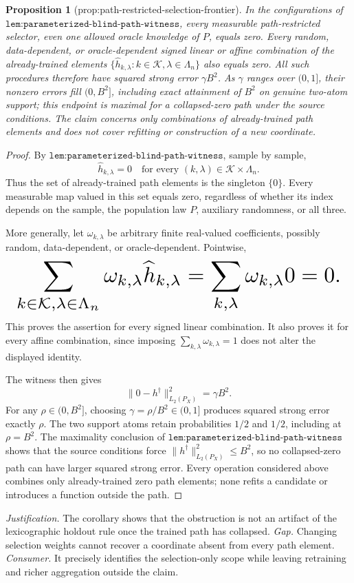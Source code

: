 \documentclass{article}
\newtheorem{proposition}{Proposition}
\begin{document}
\begin{proposition}[prop:path-restricted-selection-frontier]\label{prop:path-restricted-selection-frontier}
In the configurations of \(\texttt{lem:parameterized-blind-path-witness}\), every measurable path-restricted selector, even one allowed oracle knowledge of \(P\), equals zero. Every random, data-dependent, or oracle-dependent signed linear or affine combination of the already-trained elements \(\{\widehat h_{k,\lambda}:k\in\mathcal K,\lambda\in\Lambda_n\}\) also equals zero. All such procedures therefore have squared strong error \(\gamma B^2\). As \(\gamma\) ranges over \((0,1]\), their nonzero errors fill \((0,B^2]\), including exact attainment of \(B^2\) on genuine two-atom support; this endpoint is maximal for a collapsed-zero path under the source conditions. The claim concerns only combinations of already-trained path elements and does not cover refitting or construction of a new coordinate.
\end{proposition}
\begin{proof}
By \(\texttt{lem:parameterized-blind-path-witness}\), sample by sample,
\[
 \widehat h_{k,\lambda}=0
 \quad\text{for every }(k,\lambda)\in\mathcal K\times\Lambda_n.
\]
Thus the set of already-trained path elements is the singleton \(\{0\}\). Every measurable map valued in this set equals zero, regardless of whether its index depends on the sample, the population law \(P\), auxiliary randomness, or all three.

More generally, let \(\omega_{k,\lambda}\) be arbitrary finite real-valued coefficients, possibly random, data-dependent, or oracle-dependent. Pointwise,
\[
\makebox[\linewidth][c]{\resizebox{0.98\linewidth}{!}{\(\displaystyle \sum_{k\in\mathcal K,\lambda\in\Lambda_n}
 \omega_{k,\lambda}\widehat h_{k,\lambda}
 =\sum_{k,\lambda}\omega_{k,\lambda}0
 =0.\)}}
\]
This proves the assertion for every signed linear combination. It also proves it for every affine combination, since imposing \(\sum_{k,\lambda}\omega_{k,\lambda}=1\) does not alter the displayed identity.

The witness then gives
\[
 \|0-h^\dagger\|_{L_2(P_X)}^2=\gamma B^2.
\]
For any \(\rho\in(0,B^2]\), choosing \(\gamma=\rho/B^2\in(0,1]\) produces squared strong error exactly \(\rho\). The two support atoms retain probabilities \(1/2\) and \(1/2\), including at \(\rho=B^2\). The maximality conclusion of \(\texttt{lem:parameterized-blind-path-witness}\) shows that the source conditions force \(\|h^\dagger\|_{L_2(P_X)}^2\le B^2\), so no collapsed-zero path can have larger squared strong error. Every operation considered above combines only already-trained zero path elements; none refits a candidate or introduces a function outside the path.
\end{proof}
\par\smallskip\noindent \textit{Justification.} The corollary shows that the obstruction is not an artifact of the lexicographic holdout rule once the trained path has collapsed. \textit{Gap.} Changing selection weights cannot recover a coordinate absent from every path element. \textit{Consumer.} It precisely identifies the selection-only scope while leaving retraining and richer aggregation outside the claim.
\end{document}
